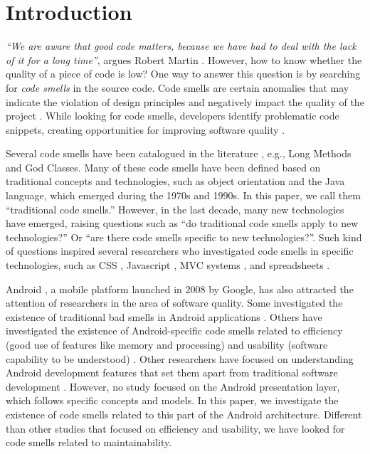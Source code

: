 
\section{Introduction}

\emph{``We are aware that good code matters, because we have had to deal with the lack of it for a long time''}, argues Robert Martin \cite{CleanCode:08}. However, how to know whether the quality of a piece of code is low? One way to answer this question is by searching for \emph{code smells} in the source code. Code smells are certain anomalies that may indicate the violation of design principles and negatively impact the quality of the project \cite{Refactoring:14}. While looking for code smells, developers identify problematic code snippets, creating opportunities for improving software quality \cite{Refactoring:99}.

Several code smells have been catalogued in the literature \cite{Refactoring:99,CleanCode:08,Refactoring:14,Webster:95}, e.g., Long Methods and God Classes. Many of these code smells have been defined based on traditional concepts and technologies, such as object orientation and the Java language, which emerged during the 1970s and 1990s. In this paper, we call them ``traditional code smells.'' However, in the last decade, many new technologies have emerged, raising questions such as ``do traditional code smells apply to new technologies?'' Or ``are there code smells specific to new technologies?''. Such kind of questions inspired several researchers who investigated code smells in specific technologies, such as CSS \cite{CSSCodeSmell}, Javascript \cite{JavascriptSmells}, MVC systems \cite{AnicheSmellsMVC:17,MvcSmells:16}, and spreadsheets \cite{SpreadsheetsSmells:12}. 

Android \cite{OHAReleasesAndroidSDK:07}, a mobile platform launched in 2008 by Google, has also attracted the attention of researchers in the area of software quality. Some investigated the existence of traditional bad smells in Android applications \cite{Hecht:15,DomainMatters,MobileSmells:13}. Others have investigated the existence of Android-specific code smells related to efficiency (good use of features like memory and processing) and usability (software capability to be understood) \cite{RemovingEnergySmells:12, 30QualitySmells:14}. Other researchers have focused on understanding Android development features that set them apart from traditional software development \cite{Mantyla2013}. However, no study focused on the Android presentation layer, which follows specific concepts and models. In this paper, we investigate the existence of code smells related to this part of the Android architecture. Different than other studies that focused on efficiency and usability, we have looked for code smells related to maintainability. 

